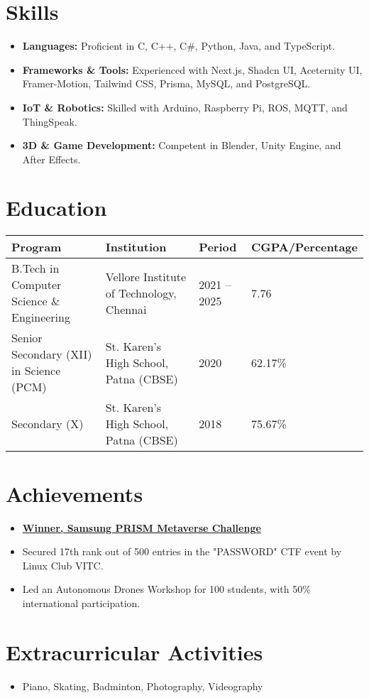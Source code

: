 \documentclass[a4paper,10pt]{article}
\newcommand{\sectionbreak}{\vspace{0.2em}}
\begin{document}
\sectionbreak

\section{Skills}
\begin{itemize}[noitemsep, topsep=0pt]
    \item \textbf{Languages:} Proficient in C, C++, C\#, Python, Java, and TypeScript.
    \item \textbf{Frameworks \& Tools:} Experienced with Next.js, Shadcn UI, Aceternity UI, Framer-Motion, Tailwind CSS, Prisma, MySQL, and PostgreSQL.
    \item \textbf{IoT \& Robotics:} Skilled with Arduino, Raspberry Pi, ROS, MQTT, and ThingSpeak.
    \item \textbf{3D \& Game Development:} Competent in Blender, Unity Engine, and After Effects.
\end{itemize}

\sectionbreak

\section{Education}
\begin{tabular}{|l|l|l|l|}
\hline
\textbf{Program} & \textbf{Institution} & \textbf{Period} & \textbf{CGPA/Percentage} \\ \hline
B.Tech in Computer Science \& Engineering & Vellore Institute of Technology, Chennai & 2021 – 2025 & 7.76 \\ \hline
Senior Secondary (XII) in Science (PCM) & St. Karen's High School, Patna (CBSE) & 2020 & 62.17\% \\ \hline
Secondary (X) & St. Karen's High School, Patna (CBSE) & 2018 & 75.67\% \\ \hline
\end{tabular}

\sectionbreak

\section{Achievements}
\begin{itemize}[noitemsep, topsep=0pt]
    \item \href{https://drive.google.com/file/d/19xeCrN3ycqXisyDDgIYeygRRVawMKOxu/view?usp=sharing}{\textcolor{accentcolor}{\textbf{Winner, Samsung PRISM Metaverse Challenge}}}
    \item Secured 17th rank out of 500 entries in the "PASSWORD" CTF event by Linux Club VITC.
    \item Led an Autonomous Drones Workshop for 100 students, with 50\% international participation.
\end{itemize}

\sectionbreak

\section{Extracurricular Activities}
\begin{itemize}[noitemsep, topsep=0pt]
    \item Piano, Skating, Badminton, Photography, Videography
\end{itemize}
\end{document}
